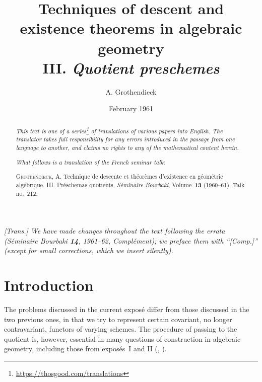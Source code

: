 \documentclass{article}
\title{Techniques of descent and existence theorems in algebraic geometry\\III. \emph{Quotient preschemes}}
\author{A. Grothendieck}
\date{February 1961}
\newcommand{\doctype}{French seminar talk}
\newcommand{\origcit}{%
  \textsc{Grothendieck, A.}
  Technique de descente et th\'{e}or\`{e}mes d'existence en g\'{e}om\'{e}trie alg\'{e}brique. III. Pr\'{e}schemas quotients.
  \emph{S\'{e}minaire Bourbaki}, Volume~\textbf{13} (1960--61), Talk no.~212.%
}
\theoremstyle{plain}
\theoremstyle{definition}
\newcommand{\oldpage}[1]{\marginpar{\footnotesize$\Big\vert$ \textit{p.~#1}}}
\begin{document}
\maketitle
\thispagestyle{fancy}

\renewcommand{\abstractname}{Translator's note.}

\begin{abstract}
  \renewcommand*{\thefootnote}{\fnsymbol{footnote}}
  \emph{This text is one of a series\footnote{\url{https://thosgood.com/translations}} of translations of various papers into English.}
  \emph{The translator takes full responsibility for any errors introduced in the passage from one language to another, and claims no rights to any of the mathematical content herein.}

  \medskip
  
  \emph{What follows is a translation of the \doctype:}

  \medskip\noindent
  \origcit
\end{abstract}

\setcounter{footnote}{0}

\setcounter{tocdepth}{1}
\tableofcontents



\subsubsection*{}

\emph{[Trans.] We have made changes throughout the text following the errata (\emph{S\'{e}minaire Bourbaki} \textbf{14}, 1961--62, Compl\'{e}ment); we preface them with ``[Comp.]'' (except for small corrections, which we insert silently).}
\medskip


\section*{Introduction}
\oldpage{212-01}

The problems discussed in the current expos\'{e} differ from those discussed in the two previous ones, in that we try to represent certain covariant, no longer contravariant, functors of varying schemes.
The procedure of passing to the quotient is, however, essential in many questions of construction in algebraic geometry, including those from expos\'{e}s~I and II (\cite{1}, \cite{2}).




\end{document}
